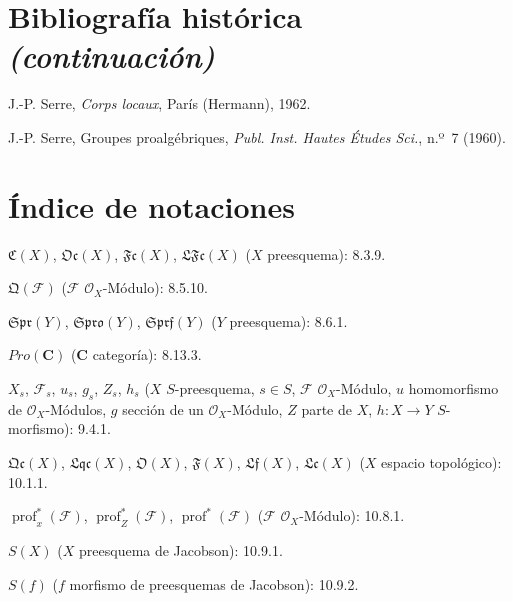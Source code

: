 \clearpage
{}
{}
\section*{Bibliografía histórica \textnormal{\emph{(continuación)}}}

\begin{description}[style=multiline,leftmargin=3.5em,labelwidth=2.8em]
  \item[{[39]}] J.-P. Serre, \emph{Corps locaux}, París (Hermann), 1962.
  \item[{[40]}] J.-P. Serre, Groupes proalgébriques,
  \emph{Publ. Inst. Hautes Études Sci.}, n.º~7 (1960).
\end{description}

\clearpage
{}
{}
\section*{Índice de notaciones}

\begingroup
\small
\setlength{\parindent}{0pt}
\setlength{\parskip}{2pt}

$\mathfrak C(X)$, $\mathfrak{Oc}(X)$, $\mathfrak{Fc}(X)$,
$\mathfrak{LFc}(X)$ ($X$ preesquema): 8.3.9.

$\mathfrak Q(\mathcal F)$ ($\mathcal F$ $\mathcal O_X$-Módulo): 8.5.10.

$\mathfrak{Spr}(Y)$, $\mathfrak{Spro}(Y)$,
$\mathfrak{Sprf}(Y)$ ($Y$ preesquema): 8.6.1.

$\boldsymbol{\mathit{Pro}}(\boldsymbol{C})$ ($\boldsymbol{C}$ categoría): 8.13.3.

$X_s$, $\mathcal F_s$, $u_s$, $g_s$, $Z_s$, $h_s$
($X$ $S$-preesquema, $s\in S$, $\mathcal F$ $\mathcal O_X$-Módulo,
$u$ homomorfismo de $\mathcal O_X$-Módulos, $g$ sección de un
$\mathcal O_X$-Módulo, $Z$ parte de $X$, $h:X\to Y$ $S$-morfismo): 9.4.1.

$\mathfrak{Qc}(X)$, $\mathfrak{Lqc}(X)$, $\mathfrak O(X)$, $\mathfrak F(X)$,
$\mathfrak{Lf}(X)$, $\mathfrak{Lc}(X)$ ($X$ espacio topológico): 10.1.1.

$\operatorname{prof}^{*}_{x}(\mathcal F)$,
$\operatorname{prof}^{*}_{Z}(\mathcal F)$,
$\operatorname{prof}^{*}(\mathcal F)$
($\mathcal F$ $\mathcal O_X$-Módulo): 10.8.1.

$S(X)$ ($X$ preesquema de Jacobson): 10.9.1.

$S(f)$ ($f$ morfismo de preesquemas de Jacobson): 10.9.2.

